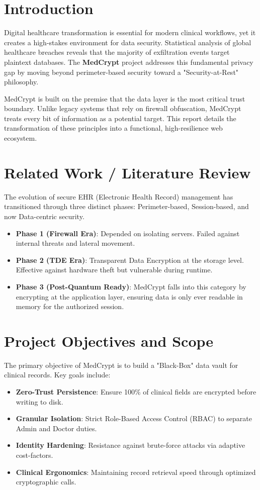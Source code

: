\documentclass[conference,onecolumn]{IEEEtran}
\begin{document}
\section{Introduction}
Digital healthcare transformation is essential for modern clinical workflows, yet it creates a high-stakes environment for data security. Statistical analysis of global healthcare breaches reveals that the majority of exfiltration events target plaintext databases. The \textbf{MedCrypt} project addresses this fundamental privacy gap by moving beyond perimeter-based security toward a "Security-at-Rest" philosophy. 

MedCrypt is built on the premise that the data layer is the most critical trust boundary. Unlike legacy systems that rely on firewall obfuscation, MedCrypt treats every bit of information as a potential target. This report details the transformation of these principles into a functional, high-resilience web ecosystem.

\section{Related Work / Literature Review}
The evolution of secure EHR (Electronic Health Record) management has transitioned through three distinct phases: Perimeter-based, Session-based, and now Data-centric security.
\begin{itemize}
    \item \textbf{Phase 1 (Firewall Era)}: Depended on isolating servers. Failed against internal threats and lateral movement.
    \item \textbf{Phase 2 (TDE Era)}: Transparent Data Encryption at the storage level. Effective against hardware theft but vulnerable during runtime.
    \item \textbf{Phase 3 (Post-Quantum Ready)}: MedCrypt falls into this category by encrypting at the application layer, ensuring data is only ever readable in memory for the authorized session.
\end{itemize}

\section{Project Objectives and Scope}
The primary objective of MedCrypt is to build a "Black-Box" data vault for clinical records. Key goals include:
\begin{itemize}
    \item \textbf{Zero-Trust Persistence}: Ensure 100\% of clinical fields are encrypted before writing to disk.
    \item \textbf{Granular Isolation}: Strict Role-Based Access Control (RBAC) to separate Admin and Doctor duties.
    \item \textbf{Identity Hardening}: Resistance against brute-force attacks via adaptive cost-factors.
    \item \textbf{Clinical Ergonomics}: Maintaining record retrieval speed through optimized cryptographic calls.
\end{itemize}
\end{document}
